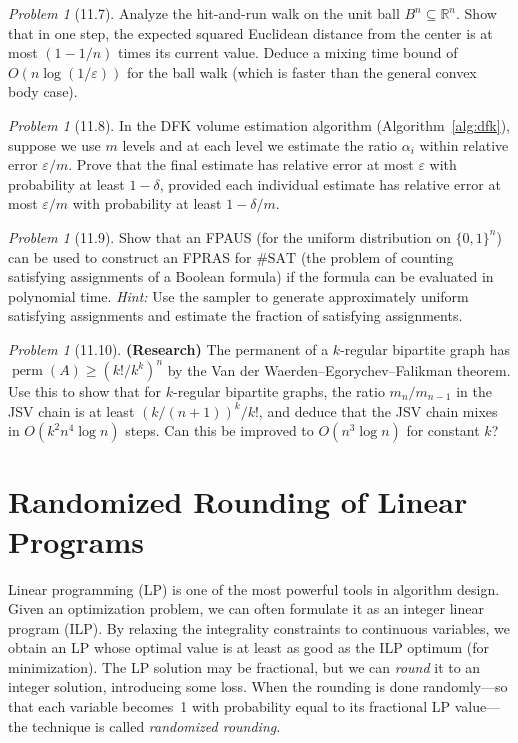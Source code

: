 \documentclass[twoside,12pt]{book}
\theoremstyle{plain}
\theoremstyle{definition}
\theoremstyle{remark}
\newtheorem{problem}[theorem]{Problem}
\begin{document}
\begin{problem}[11.7]
Analyze the hit-and-run walk on the unit ball $B^n \subseteq \mathbb{R}^n$. Show that in one step, the expected squared Euclidean distance from the center is at most $(1 - 1/n)$ times its current value. Deduce a mixing time bound of $O(n \log(1/\varepsilon))$ for the ball walk (which is faster than the general convex body case).
\end{problem}

\begin{problem}[11.8]
In the DFK volume estimation algorithm (Algorithm~\ref{alg:dfk}), suppose we use $m$ levels and at each level we estimate the ratio $\alpha_i$ within relative error $\varepsilon/m$. Prove that the final estimate has relative error at most $\varepsilon$ with probability at least $1 - \delta$, provided each individual estimate has relative error at most $\varepsilon/m$ with probability at least $1 - \delta/m$.
\end{problem}

\begin{problem}[11.9]
Show that an FPAUS (for the uniform distribution on $\{0,1\}^n$) can be used to construct an FPRAS for $\#\text{SAT}$ (the problem of counting satisfying assignments of a Boolean formula) if the formula can be evaluated in polynomial time. \textit{Hint:} Use the sampler to generate approximately uniform satisfying assignments and estimate the fraction of satisfying assignments.
\end{problem}

\begin{problem}[11.10]
\textbf{(Research)} The permanent of a $k$-regular bipartite graph has $\operatorname{perm}(A) \geq (k!/k^k)^n$ by the Van der Waerden--Egorychev--Falikman theorem. Use this to show that for $k$-regular bipartite graphs, the ratio $m_n/m_{n-1}$ in the JSV chain is at least $(k/(n+1))^k / k!$, and deduce that the JSV chain mixes in $O(k^2 n^4 \log n)$ steps. Can this be improved to $O(n^3 \log n)$ for constant $k$?
\end{problem}

\section{Randomized Rounding of Linear Programs}
\label{sec:rand-rounding}

Linear programming (LP) is one of the most powerful tools in
algorithm design. Given an optimization problem, we can often
formulate it as an integer linear program (ILP). By relaxing the
integrality constraints to continuous variables, we obtain an LP whose
optimal value is at least as good as the ILP optimum (for
minimization). The LP solution may be fractional, but we can
\emph{round} it to an integer solution, introducing some loss. When the
rounding is done randomly---so that each variable becomes~1 with
probability equal to its fractional LP value---the technique is called
\emph{randomized rounding}.
\end{document}
